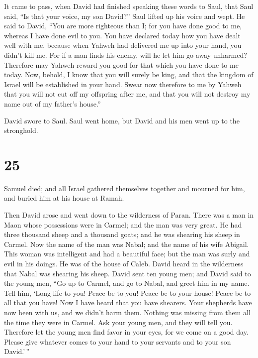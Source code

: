  It came to pass, when David had finished speaking these
words to Saul, that Saul said, ``Is that your voice, my son David?''
Saul lifted up his voice and wept.  He said to David,
``You are more righteous than I; for you have done good to me, whereas I
have done evil to you.  You have declared today how you
have dealt well with me, because when Yahweh had delivered me up into
your hand, you didn't kill me.  For if a man finds his
enemy, will he let him go away unharmed? Therefore may Yahweh reward you
good for that which you have done to me today.  Now,
behold, I know that you will surely be king, and that the kingdom of
Israel will be established in your hand.  Swear now
therefore to me by Yahweh that you will not cut off my offspring after
me, and that you will not destroy my name out of my father's house.''

 David swore to Saul. Saul went home, but David and his
men went up to the stronghold.

\hypertarget{section-24}{%
\section{25}\label{section-24}}

 Samuel died; and all Israel gathered themselves together
and mourned for him, and buried him at his house at Ramah.

Then David arose and went down to the wilderness of Paran.
 There was a man in Maon whose possessions were in Carmel;
and the man was very great. He had three thousand sheep and a thousand
goats; and he was shearing his sheep in Carmel.  Now the
name of the man was Nabal; and the name of his wife Abigail. This woman
was intelligent and had a beautiful face; but the man was surly and evil
in his doings. He was of the house of Caleb.  David heard
in the wilderness that Nabal was shearing his sheep. 
David sent ten young men; and David said to the young men, ``Go up to
Carmel, and go to Nabal, and greet him in my name.  Tell
him, `Long life to you! Peace be to you! Peace be to your house! Peace
be to all that you have!  Now I have heard that you have
shearers. Your shepherds have now been with us, and we didn't harm them.
Nothing was missing from them all the time they were in Carmel.
 Ask your young men, and they will tell you. Therefore let
the young men find favor in your eyes, for we come on a good day. Please
give whatever comes to your hand to your servants and to your son
David.'\,''

